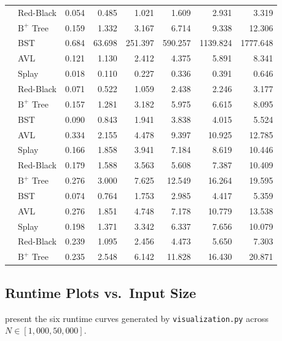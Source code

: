 \documentclass[10pt, a4paper]{article}
\newcommand{\code}[1]{\texttt{\color{primary!90!black}#1}}
\begin{document}
\begin{table}[H]
\begin{tabular}{@{}llrrrrrr@{}}
  & Red-Black & 0.054 &  0.485 &   1.021 &   1.609 &    2.931 &    3.319 \\
  & $\text{B}^+$ Tree & 0.159 &  1.332 &   3.167 &   6.714 &    9.338 &   12.306 \\
\midrule
{}
  & BST       & 0.684 & 63.698 & 251.397 & 590.257 & 1139.824 & 1777.648 \\
  & AVL       & 0.121 &  1.130 &   2.412 &   4.375 &    5.891 &    8.341 \\
  & Splay     & 0.018 &  0.110 &   0.227 &   0.336 &    0.391 &    0.646 \\
  & Red-Black & 0.071 &  0.522 &   1.059 &   2.438 &    2.246 &    3.177 \\
  & $\text{B}^+$ Tree & 0.157 &  1.281 &   3.182 &   5.975 &    6.615 &    8.095 \\
\midrule
{}
  & BST       & 0.090 &  0.843 &   1.941 &   3.838 &    4.015 &    5.524 \\
  & AVL       & 0.334 &  2.155 &   4.478 &   9.397 &   10.925 &   12.785 \\
  & Splay     & 0.166 &  1.858 &   3.941 &   7.184 &    8.619 &   10.446 \\
  & Red-Black & 0.179 &  1.588 &   3.563 &   5.608 &    7.387 &   10.409 \\
  & $\text{B}^+$ Tree & 0.276 &  3.000 &   7.625 &  12.549 &   16.264 &   19.595 \\
\midrule
{}
  & BST       & 0.074 &  0.764 &   1.753 &   2.985 &    4.417 &    5.359 \\
  & AVL       & 0.276 &  1.851 &   4.748 &   7.178 &   10.779 &   13.538 \\
  & Splay     & 0.198 &  1.371 &   3.342 &   6.337 &    7.656 &   10.079 \\
  & Red-Black & 0.239 &  1.095 &   2.456 &   4.473 &    5.650 &    7.303 \\
  & $\text{B}^+$ Tree & 0.235 &  2.548 &   6.142 &  11.828 &   16.430 &   20.871 \\
\bottomrule
\end{tabular}
\end{table}

\vspace{-0.5em}
\subsection{Runtime Plots vs.\ Input Size}
 present the six runtime curves generated by \code{visualization.py} across $N \in [1{,}000, 50{,}000]$.
\end{document}
